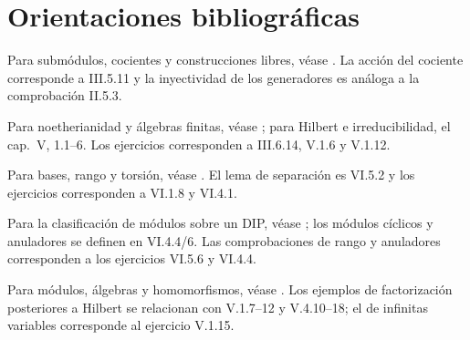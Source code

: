 \section*{Orientaciones bibliográficas}
Para submódulos, cocientes y construcciones libres, véase \citet[cap.~III, 5.8--18 y apartados 6.1--3]{aluffi2009}. La acción del cociente corresponde a III.5.11 y la inyectividad de los generadores es análoga a la comprobación II.5.3.

Para noetherianidad y álgebras finitas, véase \citet[cap.~III, 6.4--9]{aluffi2009}; para Hilbert e irreducibilidad, el cap.~V, 1.1--6. Los ejercicios corresponden a III.6.14, V.1.6 y V.1.12.

Para bases, rango y torsión, véase \citet[cap.~VI, 1.1/4--7/9--11/13--14 y 4.1--3]{aluffi2009}. El lema de separación es VI.5.2 y los ejercicios corresponden a VI.1.8 y VI.4.1.

Para la clasificación de módulos sobre un DIP, véase \citet[cap.~VI, 5.1--7]{aluffi2009}; los módulos cíclicos y anuladores se definen en VI.4.4/6. Las comprobaciones de rango y anuladores corresponden a los ejercicios VI.5.6 y VI.4.4.

Para módulos, álgebras y homomorfismos, véase \citet[cap.~III, 5.1--7]{aluffi2009}. Los ejemplos de factorización posteriores a Hilbert se relacionan con V.1.7--12 y V.4.10--18; el de infinitas variables corresponde al ejercicio V.1.15.
